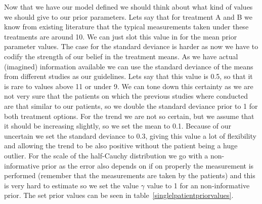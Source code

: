 \documentclass[12pt,a4paper,leqno]{report}
\theoremstyle{plain}
\theoremstyle{definition}
\theoremstyle{remark}
\begin{document}
\bigskip
{}
\bigskip

Now that we have our model defined we should think about what kind of values we should
give to our prior parameters. Lets say that for treatment A and B we know from existing
literature that the typical measurements taken under these treatments are around 10. We
can just slot this value in for the mean prior parameter values. The case for the
standard deviance is harder as now we have to codify the strength of our belief in the
treatment means. As we have actual (imagined) information available we can use the
standard deviance of the means from different studies as our guidelines. Lets say that this value is
0.5, so that it is rare to values above 11 or under 9. We can tone down this certainty
as we are not very sure that the patients on which the previous studies where conducted
are that similar to our patients, so we double the standard deviance prior to 1 for both
treatment options. For the trend we are not so certain, but we assume that it should be
increasing slightly, so we set the mean to 0.1. Because of our uncertain we set the
standard deviance
to 0.3, giving this value a lot of flexibility and allowing the trend to be also
positive without the patient being a huge outlier. For the scale of the half-Cauchy
distribution we go with a non-informative prior as the error also depends on if on
properly the measurement is performed (remember that the measurements are taken by the
patients) and this is very hard to estimate so we set the value \(\gamma \) value to 1
for an non-informative prior. The set prior values can be seen in table\ \ref{singlelpatientpriorvalues}.
\end{document}
